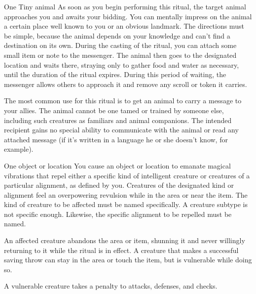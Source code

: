 \spellrng{\rnglong}
\begin{spelltarget}{One Tiny animal}
    \spelleffect As soon as you begin performing this ritual, the target animal approaches you and awaits your bidding. You can mentally impress on the animal a certain place well known to you or an obvious landmark. The directions must be simple, because the animal depends on your knowledge and can't find a destination on its own. During the casting of the ritual, you can attach some small item or note to the messenger. The animal then goes to the designated location and waits there, straying only to gather food and water as necessary, until the duration of the ritual expires. During this period of waiting, the messenger allows others to approach it and remove any scroll or token it carries.
\end{spelltarget}
\spellnotes The most common use for this ritual is to get an animal to carry a message to your allies. The animal cannot be one tamed or trained by someone else, including such creatures as familiars and animal companions. The intended recipient gains no special ability to communicate with the animal or read any attached message (if it's written in a language he or she doesn't know, for example).

\spellrng{\rngclose}
\begin{spelltarget}{One object or location}
    \spelleffect You cause an object or location to emanate magical vibrations that repel either a specific kind of intelligent creature or creatures of a particular alignment, as defined by you. Creatures of the designated kind or alignment feel an overpowering revulsion while in the area or near the item. The kind of creature to be affected must be named specifically. A creature subtype is not specific enough. Likewise, the specific alignment to be repelled must be named.
    \par An affected creature abandons the area or item, shunning it and never willingly returning to it while the ritual is in effect. A creature that makes a successful saving throw can stay in the area or touch the item, but is vulnerable while doing so.
\end{spelltarget}
\spellnotes A vulnerable creature takes a  penalty to attacks, defenses, and checks.

